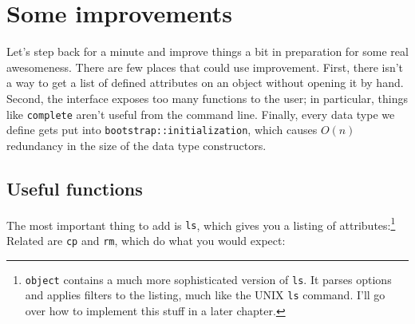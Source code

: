 \documentclass{report}
\begin{document}
\chapter{Some improvements}\label{sec:some-improvements}
  Let's step back for a minute and improve things a bit in preparation for some real awesomeness. There are few places that could use improvement. First, there isn't a way to get a list of
  defined attributes on an object without opening it by hand. Second, the interface exposes too many functions to the user; in particular, things like {\tt complete} aren't useful from the
  command line. Finally, every data type we define gets put into {\tt bootstrap::initialization}, which causes $O(n)$ redundancy in the size of the data type constructors.

\section{Useful functions}\label{sec:some-improvements-useful-functions}
    The most important thing to add is {\tt ls}, which gives you a listing of attributes:\footnote{{\tt object} contains a much more sophisticated version of {\tt ls}. It parses options and
    applies filters to the listing, much like the UNIX {\tt ls} command. I'll go over how to implement this stuff in a later chapter.} Related are {\tt cp} and {\tt rm}, which do what you
    would expect:

\end{document}
